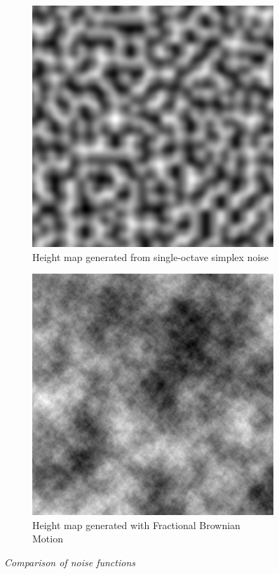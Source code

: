 \begin{figure}[H]
\begin{subfigure}{.5\textwidth}
  \centering
  \includegraphics[width=0.9\linewidth]{images/Simplex.jpg}
  \caption{Height map generated from single-octave simplex noise}
  \label{fig:sub1}
\end{subfigure}%
\begin{subfigure}{.5\textwidth}
  \centering
  \includegraphics[width=0.9\linewidth]{images/FracBrownMotion.jpg}
  \caption{Height map generated with Fractional Brownian Motion}
  \label{fig:sub2}
\end{subfigure}
\caption[Noise comparison]{\textit{Comparison of noise functions}}
\label{fig:R_kitchen_example}
\end{figure}
\newpage

